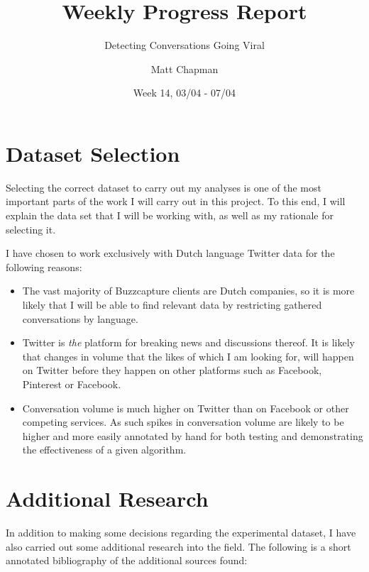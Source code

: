 \documentclass{mattreport}
\title{Weekly Progress Report}
\subtitle{Detecting Conversations Going Viral}
\date{Week 14, 03/04 - 07/04}
\author{Matt Chapman}
\begin{document}
\maketitle

\section{Dataset Selection}

Selecting the correct dataset to carry out my analyses is one of the most important parts of the work I will carry out in this project. To this end, I will explain the data set that I will be working with, as well as my rationale for selecting it.

I have chosen to work exclusively with Dutch language Twitter data for the following reasons:

\begin{itemize}
	\item The vast majority of Buzzcapture clients are Dutch companies, so it is more likely that I will be able to find relevant data by restricting gathered conversations by language.
	\item Twitter is \emph{the} platform for breaking news and discussions thereof. It is likely that changes in volume that the likes of which I am looking for, will happen on Twitter before they happen on other platforms such as Facebook, Pinterest or Facebook.
	\item Conversation volume is much higher on Twitter than on Facebook or other competing services. As such spikes in conversation volume are likely to be higher and more easily annotated by hand for both testing and demonstrating the effectiveness of a given algorithm.
\end{itemize}

\section{Additional Research}

In addition to making some decisions regarding the experimental dataset, I have also carried out some additional research into the field. The following is a short annotated bibliography of the additional sources found:\\




\newpage
\printbibliography
\end{document}
